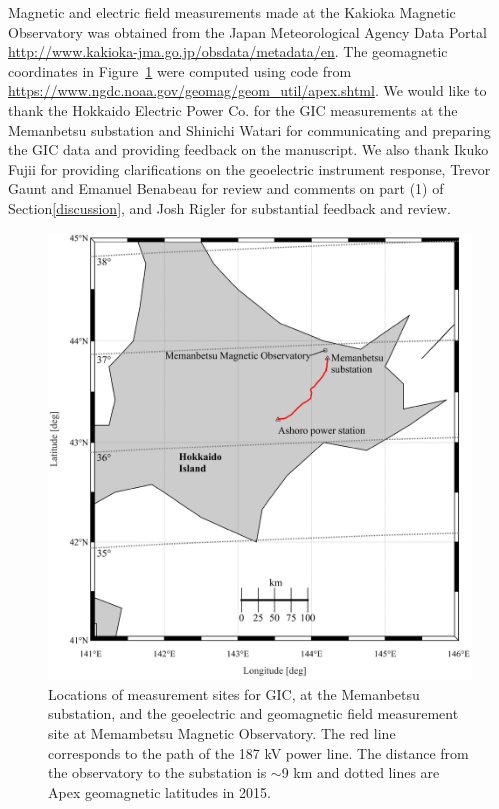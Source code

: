 \documentclass[draft,linenumbers]{agujournal2018}
\begin{document}
\acknowledgments
Magnetic and electric field measurements made at the Kakioka Magnetic Observatory was obtained from the Japan Meteorological Agency Data Portal \url{http://www.kakioka-jma.go.jp/obsdata/metadata/en}. The geomagnetic coordinates in Figure~\ref{map} were computed using code from \url{https://www.ngdc.noaa.gov/geomag/geom_util/apex.shtml}. We would like to thank the Hokkaido Electric Power Co. for the GIC measurements at the Memanbetsu substation and Shinichi Watari for communicating and preparing the GIC data and providing feedback on the manuscript. We also thank Ikuko Fujii for providing clarifications on the geoelectric instrument response, Trevor Gaunt and Emanuel Benabeau for review and comments on part (1) of Section\ref{discussion}, and Josh Rigler for substantial feedback and review.

\begin{figure}[h]
  \centering
  \includegraphics[width=\textwidth]{figures/map.pdf}
  \caption{Locations of measurement sites for GIC, at the Memanbetsu substation, and the geoelectric and geomagnetic field measurement site at Memambetsu Magnetic Observatory. The red line corresponds to the path of the 187 kV power line. The distance from the observatory to the substation is $\sim$9 km and dotted lines are Apex geomagnetic latitudes \citep{Richmond1995} in 2015.}
  \label{map}
\end{figure}
\end{document}
